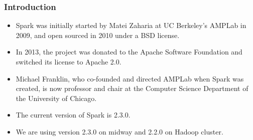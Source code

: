 \begin{frame}[fragile]
  \frametitle{Introduction}
  
\begin{itemize}
\item Spark was initially started by Matei Zaharia at UC Berkeley's AMPLab in 2009, and open sourced in 2010 under a BSD license.
\item In 2013, the project was donated to the Apache Software Foundation and switched its license to Apache 2.0. 
\item Michael Franklin, who co-founded and directed AMPLab when Spark was created, is now professor and chair at the Computer Science Department of the University of Chicago.
\item The current version of Spark is 2.3.0. 
\item We are using version 2.3.0 on midway and 2.2.0 on Hadoop cluster.
\end{itemize}
\end{frame}


